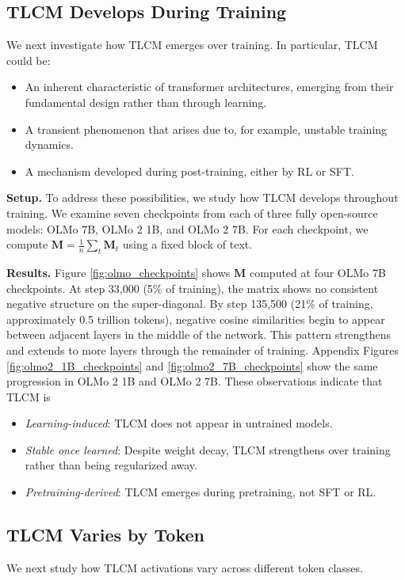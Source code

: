 \subsection{TLCM Develops During Training} \label{sec:tlcm-develops}
We next investigate how TLCM emerges over training. In particular, TLCM could be: 
\begin{itemize}
    \item An inherent characteristic of transformer architectures, emerging from their fundamental design rather than through learning.
    \item A transient phenomenon that arises due to, for example, unstable training dynamics.
    \item A mechanism developed during post-training, either by RL or SFT.
\end{itemize}


\textbf{Setup.} To address these possibilities, we study how TLCM develops throughout training. We examine seven checkpoints from each of three fully open-source models: OLMo 7B, OLMo 2 1B, and OLMo 2 7B. For each checkpoint, we compute $\mathbf{M} = \frac{1}{n}\sum_t \mathbf{M}_t$ using a fixed block of text.

\textbf{Results.} Figure \ref{fig:olmo_checkpoints} shows $\mathbf{M}$ computed at four OLMo 7B checkpoints. At step 33,000 (5\% of training), the matrix shows no consistent negative structure on the super-diagonal. By step 135,500 (21\% of training, approximately 0.5 trillion tokens), negative cosine similarities begin to appear between adjacent layers in the middle of the network. This pattern strengthens and extends to more layers through the remainder of training. Appendix Figures \ref{fig:olmo2_1B_checkpoints} and \ref{fig:olmo2_7B_checkpoints} show the same progression in OLMo 2 1B and OLMo 2 7B. These observations indicate that TLCM is
\begin{itemize}
    \item \textit{Learning-induced}: TLCM does not appear in untrained models.
    \item \textit{Stable once learned}: Despite weight decay, TLCM strengthens over training rather than being regularized away.
    \item \textit{Pretraining-derived}: TLCM emerges during pretraining, not SFT or RL.
\end{itemize}


\subsection{TLCM Varies by Token}\label{sec:tlcm-tokens}
We next study how TLCM activations vary across different token classes.

